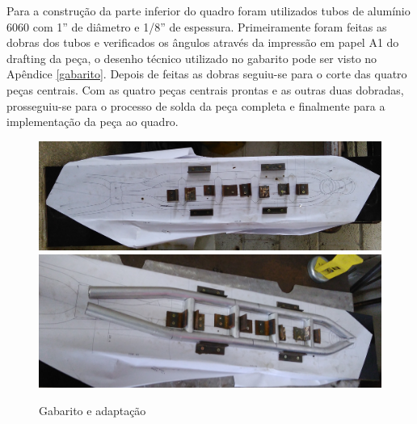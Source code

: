 	Para a construção da parte inferior do quadro foram utilizados tubos de alumínio 6060 com 1” de diâmetro e 1/8” de espessura. Primeiramente foram feitas as dobras dos tubos e verificados os ângulos através da impressão em papel A1 do drafting da peça, o desenho técnico utilizado no gabarito pode ser visto no Apêndice \ref*{gabarito}. Depois de feitas as dobras seguiu-se para o corte das quatro peças centrais. Com as quatro peças centrais prontas e as outras duas dobradas, prosseguiu-se para o processo de solda da peça completa e finalmente para a implementação da peça ao quadro.
	
	\newpage
	
	\begin{figure}[!htb]
		\centering
		\includegraphics[height=\textwidth,angle=-90]{gabarito.jpg}
		\includegraphics[width=\textwidth]{gabarito_adap.jpg}
		\caption{Gabarito e adaptação}
		\label{img:gabarito_adap}
	\end{figure}

